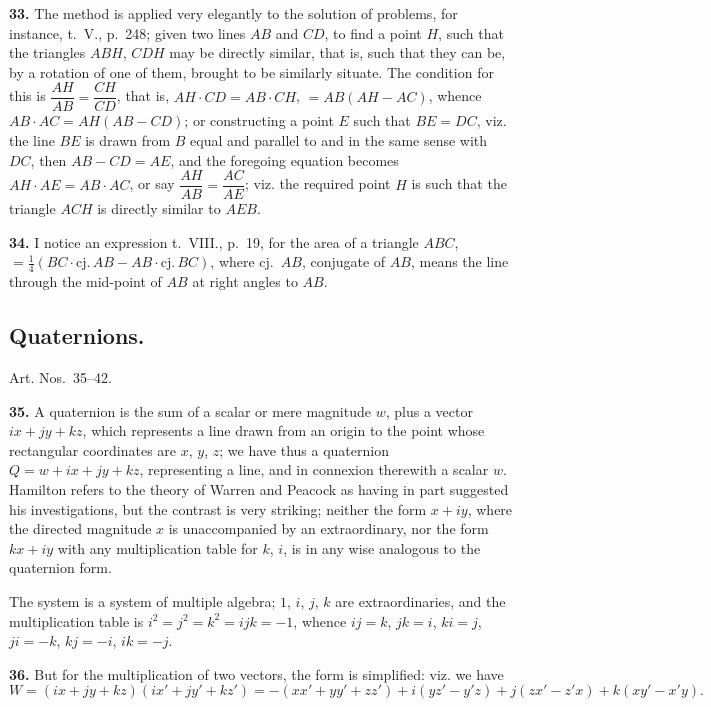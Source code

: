 \documentclass[11pt,a4paper]{book}
\begin{document}
\textbf{33.} The method is applied very elegantly to the solution of problems, for instance, t.~V., p.~248; given two lines $AB$ and $CD$, to find a point $H$, such that the triangles $ABH$, $CDH$ may be directly similar, that is, such that they can be, by a rotation of one of them, brought to be similarly situate. The condition for this is $\dfrac{AH}{AB} = \dfrac{CH}{CD}$, that is, $AH \cdot CD = AB \cdot CH$, $= AB(AH - AC)$, whence $AB \cdot AC = AH(AB - CD)$; or constructing a point $E$ such that $BE = DC$, viz. the line $BE$ is drawn from $B$ equal and parallel to and in the same sense with $DC$, then $AB - CD = AE$, and the foregoing equation becomes $AH \cdot AE = AB \cdot AC$, or say $\dfrac{AH}{AB} = \dfrac{AC}{AE}$; viz. the required point $H$ is such that the triangle $ACH$ is directly similar to $AEB$.

\textbf{34.} I notice an expression t.~VIII., p.~19, for the area of a triangle $ABC$, $= \tfrac{1}{4}(BC \cdot \text{cj.}\, AB - AB \cdot \text{cj.}\, BC)$, where cj.\ $AB$, conjugate of $AB$, means the line through the mid-point of $AB$ at right angles to $AB$.

\subsection*{Quaternions.}

Art. Nos.~35--42.

\textbf{35.} A quaternion is the sum of a scalar or mere magnitude $w$, plus a vector $ix + jy + kz$, which represents a line drawn from an origin to the point whose rectangular coordinates are $x$, $y$, $z$; we have thus a quaternion $Q = w + ix + jy + kz$, representing a line, and in connexion therewith a scalar $w$. Hamilton refers to the theory of Warren and Peacock as having in part suggested his investigations, but the contrast is very striking; neither the form $x + iy$, where the directed magnitude $x$ is unaccompanied by an extraordinary, nor the form $kx + iy$ with any multiplication table for $k$, $i$, is in any wise analogous to the quaternion form.

The system is a system of multiple algebra; $1$, $i$, $j$, $k$ are extraordinaries, and the multiplication table is $i^2 = j^2 = k^2 = ijk = -1$, whence $ij = k$, $jk = i$, $ki = j$, $ji = -k$, $kj = -i$, $ik = -j$.

\textbf{36.} But for the multiplication of two vectors, the form is simplified: viz. we have
\[
W = (ix + jy + kz)(ix' + jy' + kz') = -(xx' + yy' + zz') + i(yz' - y'z) + j(zx' - z'x) + k(xy' - x'y).
\]
\end{document}
